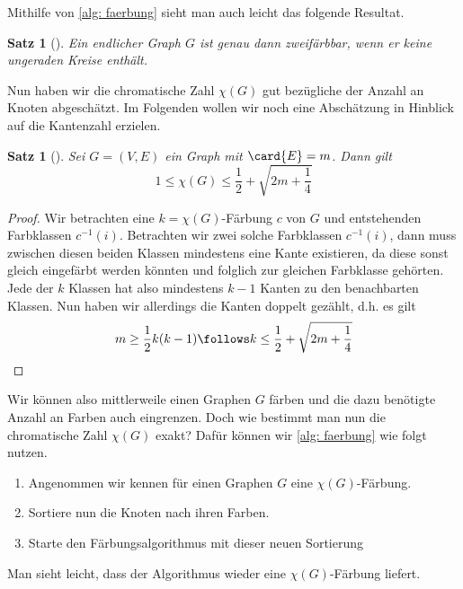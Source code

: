 \documentclass[ngerman, a4paper, 12pt]{article}
\newcounter{themcount}
\theoremstyle{plain}
\newtheorem{satz}[themcount]{Satz}
\theoremstyle{break}
\theoremstyle{proofstyle}
\newtheorem{proof}{Beweis}
\begin{document}
	Mithilfe von \cref{alg: faerbung} sieht man auch leicht das folgende Resultat.
	
	\begin{satz}[\cite{bodirsky}]
		Ein endlicher Graph $G$ ist genau dann zweifärbbar, wenn er keine ungeraden Kreise enthält.
	\end{satz}

	Nun haben wir die chromatische Zahl $\chi(G)$ gut bezügliche der Anzahl an Knoten abgeschätzt. Im Folgenden wollen wir noch eine Abschätzung in Hinblick auf die Kantenzahl erzielen.
	
	\begin{satz}[\cite{diestel}]
		Sei $G = (V,E)$ ein Graph mit $\card{E} = m$. Dann gilt
		\begin{equation}
			1 \le \chi(G) \le \frac{1}{2} + \sqrt{2m + \frac{1}{4}}
			\label{eq: chi-kanten}
		\end{equation}
	\end{satz}
	\begin{proof}
		Wir betrachten eine $k = \chi(G)$-Färbung $c$ von $G$ und entstehenden Farbklassen $c^{-1}(i)$. Betrachten wir zwei solche Farbklassen $c^{-1}(i)$, dann muss zwischen diesen beiden Klassen mindestens eine Kante existieren, da diese sonst gleich eingefärbt werden könnten und folglich zur gleichen Farbklasse gehörten. Jede der $k$ Klassen hat also mindestens $k-1$ Kanten zu den benachbarten Klassen. Nun haben wir allerdings die Kanten doppelt gezählt, d.h. es gilt
		\begin{equation*}
			m \ge \frac{1}{2} k (k-1) \follows k \le \frac{1}{2} + \sqrt{2m + \frac{1}{4}}
		\end{equation*}
	\end{proof}

	Wir können also mittlerweile einen Graphen $G$ färben und die dazu benötigte Anzahl an Farben auch eingrenzen. Doch wie bestimmt man nun die chromatische Zahl $\chi(G)$ exakt? Dafür können wir \cref{alg: faerbung} wie folgt nutzen.
	\begin{enumerate}[nolistsep, topsep=-\parskip]
		\item Angenommen wir kennen für einen Graphen $G$ eine $\chi(G)$-Färbung.
		\item Sortiere nun die Knoten nach ihren Farben.
		\item Starte den Färbungsalgorithmus mit dieser neuen Sortierung
	\end{enumerate}
	Man sieht leicht, dass der Algorithmus wieder eine $\chi(G)$-Färbung liefert.
	
\end{document}
